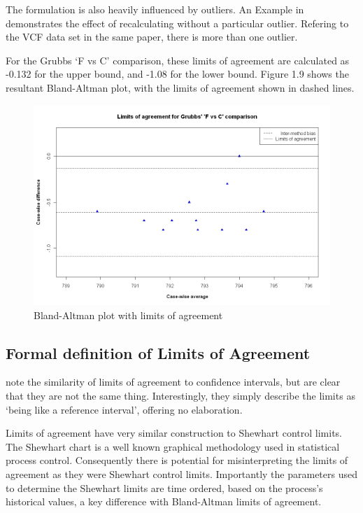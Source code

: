 \documentclass[12pt, a4paper]{report}
\theoremstyle{plain}
\theoremstyle{definition}
\theoremstyle{remark}
\begin{document}
The formulation is also heavily influenced by outliers. An Example
in \citet*{BA83} demonstrates the effect of recalculating without
a particular outlier. Refering to the VCF data set in the same
paper, there is more than one outlier.

For the Grubbs `F vs C' comparison, these limits of
agreement are calculated as -0.132 for the upper bound, and -1.08
for the lower bound. Figure 1.9 shows the resultant Bland-Altman
plot, with the limits of agreement shown in dashed lines.


\begin{figure}[h!]
	\begin{center}
		\includegraphics[width=125mm]{images/GrubbsBAplot-LOA.jpeg}
		\caption{Bland-Altman plot with limits of agreement}\label{GrubbsBAplot-noLOA}
	\end{center}
\end{figure}

\subsection{Formal definition of Limits of Agreement}
\citet{BA99} note the similarity of limits of agreement to confidence intervals, but are clear that they are not the same
thing. Interestingly, they simply describe the limits as `being like a reference interval', offering no elaboration.

Limits of agreement have very similar construction to Shewhart control limits. The Shewhart chart is a well known graphical
methodology used in statistical process control. Consequently there is potential for misinterpreting the limits of agreement as
they were Shewhart control limits. Importantly the parameters used to determine the Shewhart limits are time ordered, based on the process's historical values, a key difference with Bland-Altman limits of agreement.
\end{document}
